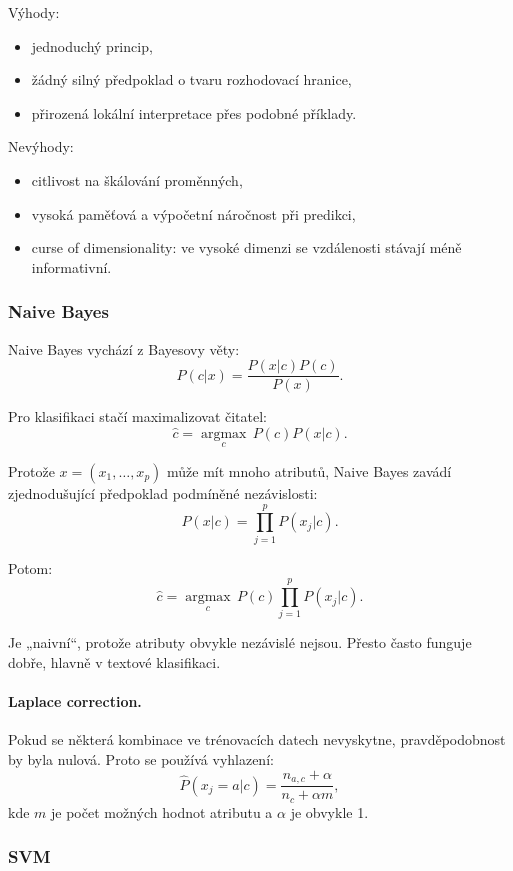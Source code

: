 Výhody:
\begin{itemize}
    \item jednoduchý princip,
    \item žádný silný předpoklad o tvaru rozhodovací hranice,
    \item přirozená lokální interpretace přes podobné příklady.
\end{itemize}

Nevýhody:
\begin{itemize}
    \item citlivost na škálování proměnných,
    \item vysoká paměťová a výpočetní náročnost při predikci,
    \item curse of dimensionality: ve vysoké dimenzi se vzdálenosti stávají méně informativní.
\end{itemize}

\subsubsection{Naive Bayes}

Naive Bayes vychází z Bayesovy věty:
\[
P(c|x)=\frac{P(x|c)P(c)}{P(x)}.
\]

Pro klasifikaci stačí maximalizovat čitatel:
\[
\hat{c}
=
\underset{c}{\operatorname{argmax}}
\,
P(c)P(x|c).
\]

Protože $x=(x_1,\ldots,x_p)$ může mít mnoho atributů, Naive Bayes zavádí zjednodušující předpoklad
podmíněné nezávislosti:
\[
P(x|c)=\prod_{j=1}^p P(x_j|c).
\]

Potom:
\[
\hat{c}
=
\underset{c}{\operatorname{argmax}}
\,
P(c)\prod_{j=1}^p P(x_j|c).
\]

Je „naivní“, protože atributy obvykle nezávislé nejsou. Přesto často funguje dobře, hlavně v textové
klasifikaci.

\paragraph{Laplace correction.}
Pokud se některá kombinace ve trénovacích datech nevyskytne, pravděpodobnost by byla nulová. Proto se používá
vyhlazení:
\[
\hat{P}(x_j=a|c)=
\frac{n_{a,c}+\alpha}{n_c+\alpha m},
\]
kde $m$ je počet možných hodnot atributu a $\alpha$ je obvykle 1.

\subsubsection{SVM}

